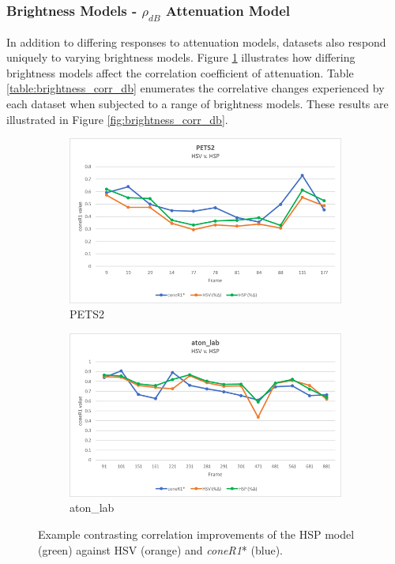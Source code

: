 \subsubsection{Brightness Models - $\rho_{dB}$ Attenuation Model}

In addition to differing responses to attenuation models, datasets also respond uniquely to varying brightness models. Figure \ref{fig:brightness_example} illustrates how differing brightness models affect the correlation coefficient of attenuation. Table \ref{table:brightness_corr_db} enumerates the correlative changes experienced by each dataset when subjected to a range of brightness models. These results are illustrated in Figure \ref{fig:brightness_corr_db}.

\begin{figure}
\centering
\begin{subfigure}{.8\linewidth}
  \includegraphics[width=1\linewidth]{figures/pets2_hsv_hsp.jpg}
  \caption{PETS2}
\end{subfigure}
\hfill
\begin{subfigure}{.8\linewidth}
  \includegraphics[width=1\linewidth]{figures/lab_hsv_hsp.jpg}
  \caption{aton\_lab}
\end{subfigure}

\caption{Example contrasting correlation improvements of the HSP model (green) against HSV (orange) and \textit{coneR1}* (blue). }
\label{fig:brightness_example}
\end{figure}

